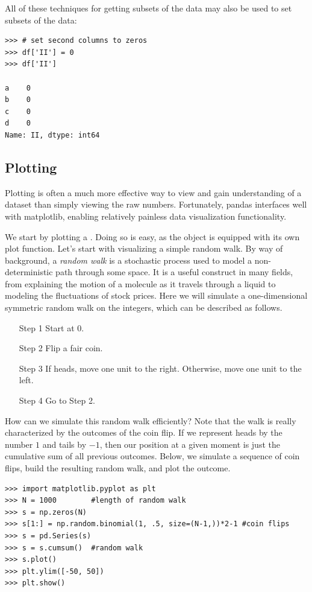 All of these techniques for getting subsets of the data may also be used to set subsets of the data:
\begin{lstlisting}
>>> # set second columns to zeros
>>> df['II'] = 0
>>> df['II']

a    0
b    0
c    0
d    0
Name: II, dtype: int64
\end{lstlisting}

\subsection*{Plotting}
Plotting is often a much more effective way to view and gain understanding of a dataset than simply
viewing the raw numbers. Fortunately, pandas interfaces well with matplotlib, enabling relatively
painless data visualization functionality.

We start by plotting a . Doing so is easy, as the  object is equipped with its own plot
function.
Let's start with visualizing a simple random walk. By way of background, a \emph{random walk} is a
stochastic process used to model a non-deterministic path through some space. It is a useful construct in
many fields, from explaining the motion of a molecule as it travels through a liquid to modeling the fluctuations
of stock prices. Here we will simulate a one-dimensional symmetric random walk on the integers, which can be
described as follows.
\begin{itemize}
  \item[Step 1] Start at 0.
  \item[Step 2] Flip a fair coin.
  \item[Step 3] If heads, move one unit to the right. Otherwise, move one unit to the left.
  \item[Step 4] Go to Step 2.
\end{itemize}
How can we simulate this random walk efficiently? Note that the walk is really characterized by the outcomes
of the coin flip. If we represent heads by the number $1$ and tails by $-1$, then our position at a given moment
is just the cumulative sum of all previous outcomes. Below, we simulate a sequence of coin flips, build the
resulting random walk, and plot the outcome.
\begin{lstlisting}
>>> import matplotlib.pyplot as plt
>>> N = 1000        #length of random walk
>>> s = np.zeros(N)
>>> s[1:] = np.random.binomial(1, .5, size=(N-1,))*2-1 #coin flips
>>> s = pd.Series(s)
>>> s = s.cumsum()  #random walk
>>> s.plot()
>>> plt.ylim([-50, 50])
>>> plt.show()
\end{lstlisting}

